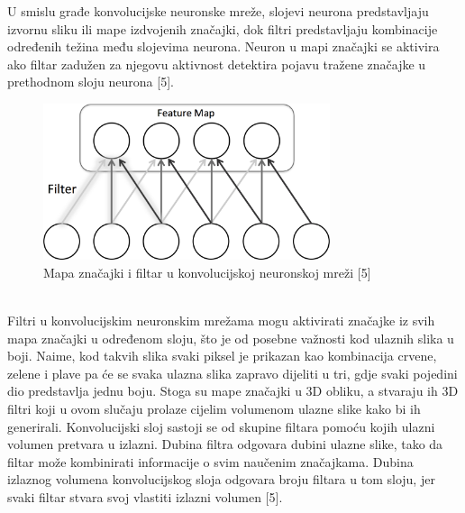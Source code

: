 \documentclass[times, utf8, zavrsni]{fer}
\begin{document}
\indent{}   
U smislu građe konvolucijske neuronske mreže, slojevi neurona predstavljaju izvornu sliku ili mape izdvojenih značajki, dok filtri predstavljaju kombinacije određenih težina među slojevima neurona. Neuron u mapi značajki se aktivira ako filtar zadužen za njegovu aktivnost detektira pojavu tražene značajke u prethodnom sloju neurona [5].\\
%
\begin{figure}[!h]
\centering
\includegraphics[width=0.75\textwidth]{./slike/conv6}
\caption{Mapa značajki i filtar u konvolucijskoj neuronskoj mreži [5]}
\label{fig:conv5}
\end{figure}
% 
\\
\indent{}
Filtri u konvolucijskim neuronskim mrežama mogu aktivirati značajke iz svih mapa značajki u određenom sloju, što je od posebne važnosti kod ulaznih slika u boji. Naime, kod takvih slika svaki piksel je prikazan kao kombinacija crvene, zelene i plave  pa će se svaka ulazna slika zapravo dijeliti u tri, gdje svaki pojedini dio predstavlja jednu boju. Stoga su mape značajki u 3D obliku, a stvaraju ih 3D filtri koji u ovom slučaju prolaze cijelim volumenom ulazne slike kako bi ih generirali. Konvolucijski sloj sastoji se od skupine filtara pomoću kojih ulazni volumen pretvara u izlazni. Dubina filtra odgovara dubini ulazne slike, tako da filtar može kombinirati informacije o svim naučenim značajkama. Dubina izlaznog volumena konvolucijskog sloja odgovara broju filtara u tom sloju, jer svaki filtar stvara svoj vlastiti izlazni volumen [5].\\
\end{document}
